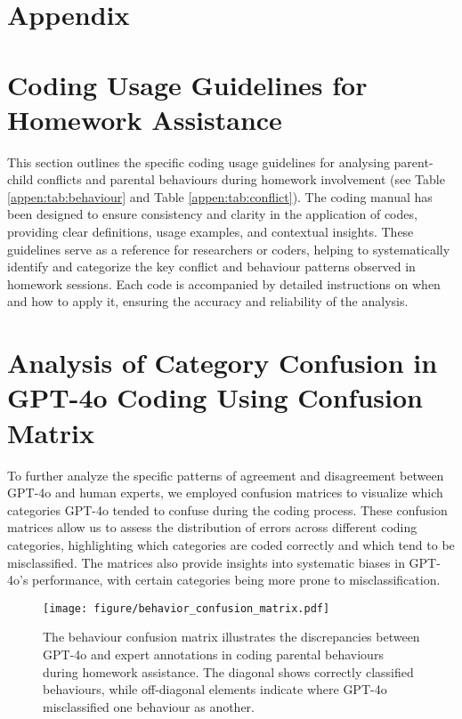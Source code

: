 \section*{Appendix}
\section{Coding Usage Guidelines for Homework Assistance\label{sec:guide}}


This section outlines the specific coding usage guidelines for analysing parent-child conflicts and parental behaviours during homework involvement (see Table \ref{appen:tab:behaviour} and Table \ref{appen:tab:conflict}). The coding manual has been designed to ensure consistency and clarity in the application of codes, providing clear definitions, usage examples, and contextual insights. These guidelines serve as a reference for researchers or coders, helping to systematically identify and categorize the key conflict and behaviour patterns observed in homework sessions. Each code is accompanied by detailed instructions on when and how to apply it, ensuring the accuracy and reliability of the analysis.

\section{Analysis of Category Confusion in GPT-4o Coding Using Confusion Matrix\label{sec:Confusion}}



To further analyze the specific patterns of agreement and disagreement between GPT-4o and human experts, we employed confusion matrices to visualize which categories GPT-4o tended to confuse during the coding process. These confusion matrices allow us to assess the distribution of errors across different coding categories, highlighting which categories are coded correctly and which tend to be misclassified. The matrices also provide insights into systematic biases in GPT-4o’s performance, with certain categories being more prone to misclassification.
\begin{figure}
    \centering
    \texttt{[image: figure/behavior\_confusion\_matrix.pdf]}
    \caption{The behaviour confusion matrix illustrates the discrepancies between GPT-4o and expert annotations in coding parental behaviours during homework assistance. The diagonal shows correctly classified behaviours, while off-diagonal elements indicate where GPT-4o misclassified one behaviour as another. }
    \label{fig:behaviour_confusion}
\end{figure}


